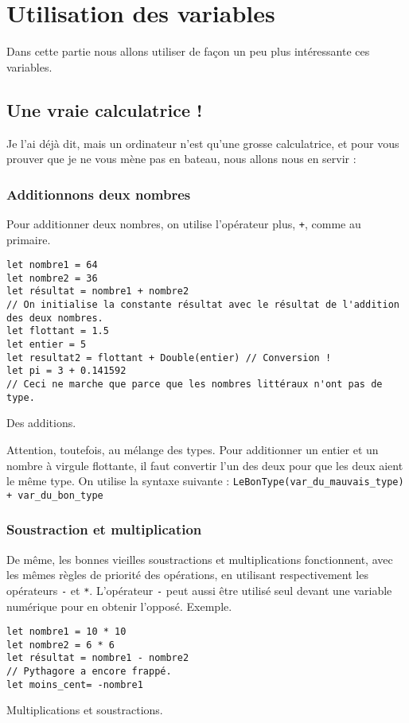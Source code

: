 \chapter{Utilisation des variables}

Dans cette partie nous allons utiliser de façon un peu plus intéressante ces variables.

\section{Une vraie calculatrice !}
Je l'ai déjà dit, mais un ordinateur n'est qu'une grosse calculatrice, et pour vous prouver que
je ne vous mène pas en bateau, nous allons nous en servir :
\subsection{Additionnons deux nombres}
Pour additionner deux nombres, on utilise l'opérateur plus, \verb"+", comme au primaire.
\begin{listing}
\begin{verbatim}
let nombre1 = 64
let nombre2 = 36
let résultat = nombre1 + nombre2
// On initialise la constante résultat avec le résultat de l'addition des deux nombres.
let flottant = 1.5
let entier = 5
let resultat2 = flottant + Double(entier) // Conversion !
let pi = 3 + 0.141592 
// Ceci ne marche que parce que les nombres littéraux n'ont pas de type.
\end{verbatim}
\caption{Des additions.}
\end{listing}

Attention, toutefois, au mélange des types. Pour additionner un entier et un nombre à virgule flottante, il faut convertir l'un des deux pour que les deux aient le même type.
On utilise la syntaxe suivante : \texttt{LeBonType(var_du_mauvais_type) + var_du_bon_type}
\subsection{Soustraction et multiplication}
De même, les bonnes vieilles soustractions et multiplications fonctionnent, avec les mêmes règles de priorité des opérations, en utilisant respectivement les opérateurs \verb"-" et \verb"*".
L'opérateur \verb"-" peut aussi être utilisé seul devant une variable numérique pour en obtenir l'opposé.
Exemple.
\begin{listing}
\begin{verbatim}
let nombre1 = 10 * 10
let nombre2 = 6 * 6
let résultat = nombre1 - nombre2
// Pythagore a encore frappé. 
let moins_cent= -nombre1
\end{verbatim}
\caption{Multiplications et soustractions.}
\end{listing}

